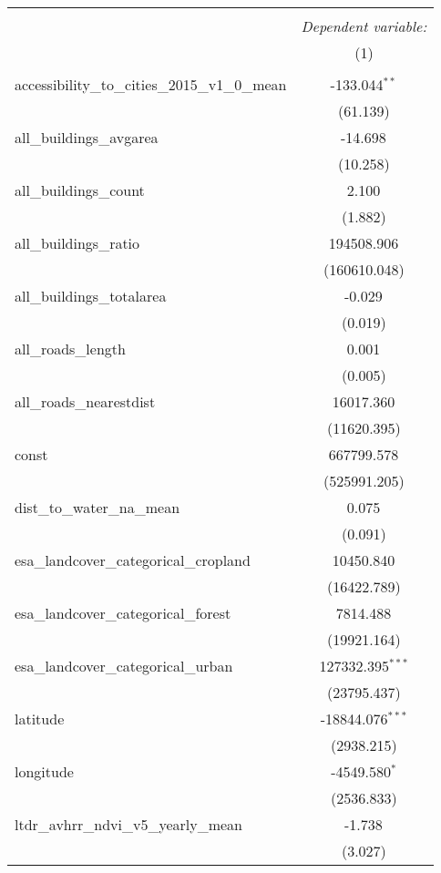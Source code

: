 \begin{table}[!htbp] \centering
\begin{tabular}{@{\extracolsep{5pt}}lc}
\\[-1.8ex]\hline
\hline \\[-1.8ex]
& \multicolumn{1}{c}{\textit{Dependent variable:}} \
\cr \cline{1-2}
\\[-1.8ex] & (1) \\
\hline \\[-1.8ex]
 accessibility_to_cities_2015_v1_0_mean & -133.044$^{**}$ \\
  & (61.139) \\
 all_buildings_avgarea & -14.698$^{}$ \\
  & (10.258) \\
 all_buildings_count & 2.100$^{}$ \\
  & (1.882) \\
 all_buildings_ratio & 194508.906$^{}$ \\
  & (160610.048) \\
 all_buildings_totalarea & -0.029$^{}$ \\
  & (0.019) \\
 all_roads_length & 0.001$^{}$ \\
  & (0.005) \\
 all_roads_nearestdist & 16017.360$^{}$ \\
  & (11620.395) \\
 const & 667799.578$^{}$ \\
  & (525991.205) \\
 dist_to_water_na_mean & 0.075$^{}$ \\
  & (0.091) \\
 esa_landcover_categorical_cropland & 10450.840$^{}$ \\
  & (16422.789) \\
 esa_landcover_categorical_forest & 7814.488$^{}$ \\
  & (19921.164) \\
 esa_landcover_categorical_urban & 127332.395$^{***}$ \\
  & (23795.437) \\
 latitude & -18844.076$^{***}$ \\
  & (2938.215) \\
 longitude & -4549.580$^{*}$ \\
  & (2536.833) \\
 ltdr_avhrr_ndvi_v5_yearly_mean & -1.738$^{}$ \\
  & (3.027) \\

\end{tabular}
\end{table}
